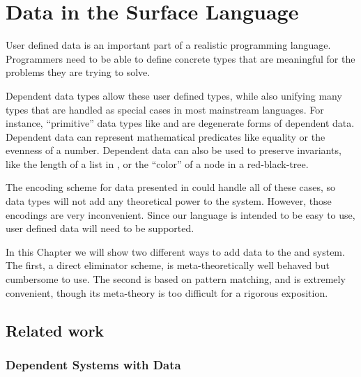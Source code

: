\chapter{Data in the Surface Language}
\label{chapter:SurfaceData}
\thispagestyle{myheadings}

User defined data is an important part of a realistic programming language.
Programmers need to be able to define concrete types that are meaningful for the problems they are trying to solve.

Dependent data types allow these user defined types, while also unifying many types that are handled as special cases in most mainstream languages.
For instance, ``primitive'' data types like \Nat{} and \Bool{} are degenerate forms of dependent data.
Dependent data can represent mathematical predicates like equality or the evenness of a number.
Dependent data can also be used to preserve invariants, like the length of a list in \Vect{}, or the ``color'' of a node in a red-black-tree.

The encoding scheme for data presented in  could handle all of these cases, so data types will not add any theoretical power to the system.
However, those encodings are very inconvenient. 
Since our language is intended to be easy to use, user defined data will need to be supported.

In this Chapter we will show two different ways to add data to the \slang{} and \bidir{} system.
The first, a direct eliminator scheme, is meta-theoretically well behaved but cumbersome to use.
The second is based on pattern matching, and is extremely convenient, though its meta-theory is too difficult for a rigorous exposition.






\section{Related work}

\subsection{Dependent Systems with Data}

